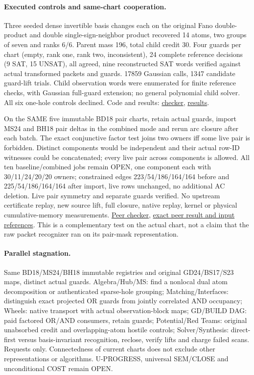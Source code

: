 \documentclass[11pt]{article}
\begin{document}
\paragraph{Executed controls and same-chart cooperation.}
Three seeded dense invertible basis changes each on the original Fano double-product and double single-sign-neighbor product recovered 14 atoms, two groups of seven and ranks 6/6. Parent mass 196, total child credit 30. Four guards per chart (empty, rank one, rank two, inconsistent), 24 complete reference decisions (9 SAT, 15 UNSAT), all agreed, nine reconstructed SAT words verified against actual transformed packets and guards. 17859 Gaussian calls, 1347 candidate guard-lift trials. Child observation words were enumerated for finite reference checks, with Gaussian full-guard extension; no general polynomial child solver. All six one-hole controls declined. Code and results: \href{https://github.com/j15marti/pnp/commit/06d84123cc4b3692b3d51a339c32b0e431b12f8b}{checker}, \href{https://github.com/j15marti/pnp/commit/3b4b6b5233aac8eeb08ecbede54610e80ef70dcf}{results}.

On the SAME five immutable BD18 pair charts, retain actual guards, import MS24 and BH18 pair deltas in the combined mode and rerun arc closure after each batch. The exact conjunctive factor test joins two owners iff some live pair is forbidden. Distinct components would be independent and their actual row-ID witnesses could be concatenated; every live pair across components is allowed. All ten baseline/combined jobs remain OPEN, one component each with 30/11/24/20/20 owners; constrained edges 223/54/186/164/164 before and 225/54/186/164/164 after import, live rows unchanged, no additional AC deletion. Live pair symmetry and separate guards verified. No upstream certificate replay, new source lift, full closure, native replay, kernel or physical cumulative-memory measurements. \href{https://github.com/j15marti/pnp/commit/c99565d4aba58b839cb244d4020903ae1f78f013}{Peer checker}, \href{https://github.com/j15marti/pnp/commit/b96ef71b0da78092238e0fa85266613c485a6daf}{exact peer result and input references}. This is a complementary test on the actual chart, not a claim that the raw packet recognizer ran on its pair-mask representation.

\paragraph{Parallel stagnation.}
Same BD18/MS24/BH18 immutable registries and original GD24/BS17/S23 maps, distinct actual guards. Algebra/Hub/MS: find a nonlocal dual atom decomposition or authenticated sparse-hole grouping; Matching/Interfaces: distinguish exact projected OR guards from jointly correlated AND occupancy; Wheels: native transport with actual observation-block maps; GD/BUILD DAG: paid factored OR/AND consumers, retain guards; Potential/Red Teams: original unabsorbed credit and overlapping-atom hostile controls; Solver/Synthesis: direct-first versus basis-invariant recognition, reclose, verify lifts and charge failed scans. Requests only. Connectedness of current charts does not exclude other representations or algorithms. U-PROGRESS, universal SEM/CLOSE and unconditional COST remain OPEN.
\end{document}
